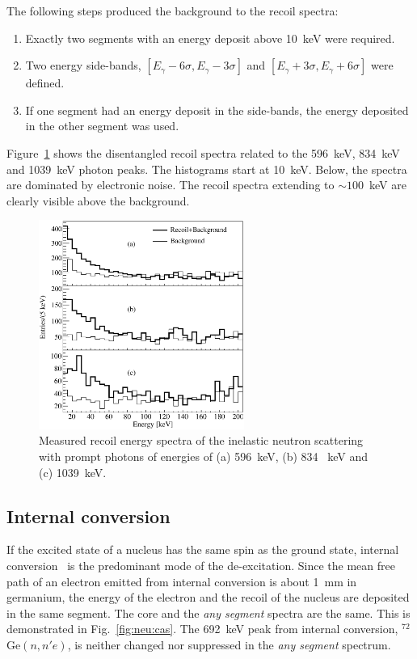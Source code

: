 The following steps produced the background to the recoil spectra:
\begin{enumerate}
\item Exactly two segments with an energy deposit above 10~keV were   required.
\item Two energy side-bands, $[E_\gamma-6\sigma, E_\gamma-3\sigma]$
  and $[E_\gamma+3\sigma, E_\gamma+6\sigma]$ were defined.
\item If one segment had an energy deposit in the side-bands, the
  energy deposited in the other segment was used.
\end{enumerate}

Figure~\ref{fig:neu:recoil} shows the disentangled recoil spectra related to the 596~keV, 834~keV and 1039~keV photon peaks. The histograms start at 10~keV. Below, the spectra are dominated by electronic noise. The recoil spectra extending to $\sim 100$~keV are clearly visible above the background.

\begin{figure}[tbhp]
  \centering
  \includegraphics[width=0.6\textwidth]{recoil}
  \caption{Measured recoil energy spectra of the inelastic neutron     scattering with prompt photons of energies of (a) 596~keV, (b) 834     ~keV and (c) 1039~keV.}
  \label{fig:neu:recoil}
\end{figure}

\subsection{Internal conversion}
\label{sec:neu:conv}
If the excited state of a nucleus has the same spin as the ground
state, internal conversion~\cite{Lis69,Kra56} is the predominant mode
of the de-excitation. Since the mean free path of an electron emitted
from internal conversion is about 1~mm in germanium, the energy of the
electron and the recoil of the nucleus are deposited in the same
segment. The core and the \emph{any segment} spectra are the same.
This is demonstrated in Fig.~\ref{fig:neu:cas}. The 692~keV peak from
internal conversion, $^{72}$Ge$(n,n'e)$, is neither changed nor
suppressed in the \emph{any segment} spectrum.

